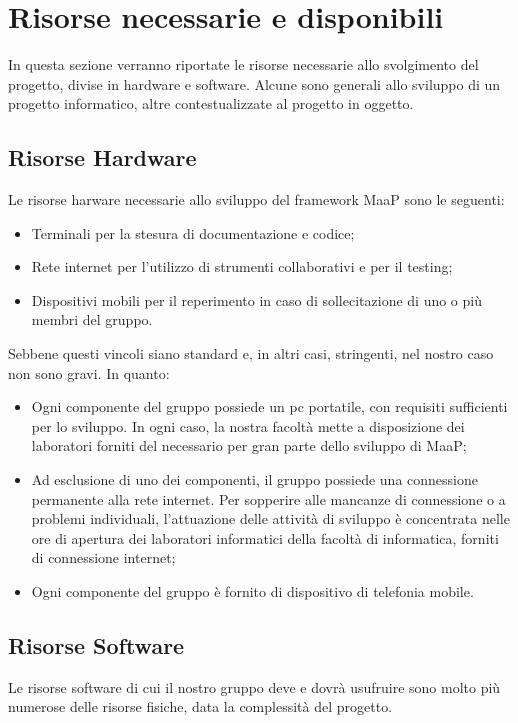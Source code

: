 \newpage





\newpage


\section{Risorse necessarie e disponibili}
In questa sezione verranno riportate le risorse necessarie allo svolgimento del progetto, divise in hardware e software. Alcune sono generali allo sviluppo di un progetto informatico, altre contestualizzate al progetto in oggetto.

\subsection{Risorse Hardware}
Le risorse harware necessarie allo sviluppo del framework MaaP sono le seguenti:
\begin{itemize}
\item Terminali per la stesura di documentazione e codice;
\item Rete internet per l'utilizzo di strumenti collaborativi e per il testing;
\item Dispositivi mobili per il reperimento in caso di sollecitazione di uno o più membri del gruppo.
\end{itemize}
Sebbene questi vincoli siano standard e, in altri casi, stringenti, nel nostro caso non sono gravi. In quanto:
\begin{itemize}
\item Ogni componente del gruppo possiede un pc portatile, con requisiti sufficienti per lo sviluppo. In ogni caso, la nostra facoltà mette a disposizione dei laboratori forniti del necessario per gran parte dello sviluppo di MaaP;
\item Ad esclusione di uno dei componenti, il gruppo possiede una connessione permanente alla rete internet. Per sopperire alle mancanze di connessione o a problemi individuali, l'attuazione delle attività di sviluppo è concentrata nelle ore di apertura dei laboratori informatici della facoltà di informatica, forniti di connessione internet;
\item Ogni componente del gruppo è fornito di dispositivo di telefonia mobile. 
\end{itemize}

\subsection{Risorse Software}
Le risorse software di cui il nostro gruppo deve e dovrà usufruire sono molto più numerose delle risorse fisiche, data la complessità del progetto. 
